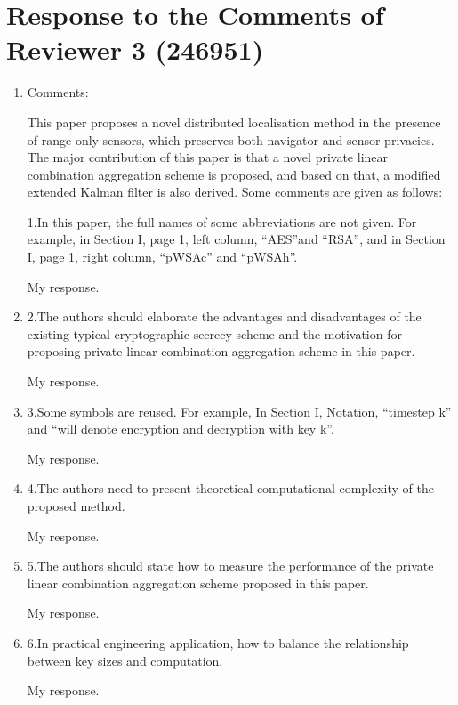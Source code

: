 \documentclass[a4paper]{scrartcl}
\newenvironment{rebuttal}{\begin{enumerate}[label={\color{grey}\thesection.\arabic{enumi}},leftmargin=0pt,ref=\thesection.\arabic{enumi}]}{\end{enumerate}}
\newcommand{\reviewtext}[1]{{\color{nblue} #1}}
\begin{document}
\section*{Response to the Comments of Reviewer 3 (246951)}
\def\thesection{R3}
\begin{rebuttal}
\item \reviewtext{Comments:

This paper proposes a novel distributed localisation method in the presence of range-only sensors, which preserves both navigator and sensor privacies. The major contribution of this paper is that a novel private linear combination aggregation scheme is proposed, and based on that, a modified extended Kalman filter is also derived. Some comments are given as follows:

1.In this paper, the full names of some abbreviations are not given. For example, in Section I, page 1, left column, “AES”and “RSA”, and in Section I, page 1, right column, “pWSAc” and “pWSAh”.}

My response.

\item \reviewtext{2.The authors should elaborate the advantages and disadvantages of the existing typical cryptographic secrecy scheme and the motivation for proposing private linear combination aggregation scheme in this paper.}

My response.

\item \reviewtext{3.Some symbols are reused. For example, In Section I, Notation, “timestep k” and “will denote encryption and decryption with key k”.}

My response.

\item \reviewtext{4.The authors need to present theoretical computational complexity of the proposed method.}

My response.

\item \reviewtext{5.The authors should state how to measure the performance of the private linear combination aggregation scheme proposed in this paper.}

My response.

\item \reviewtext{6.In practical engineering application, how to balance the relationship between key sizes and computation.}

My response.

\end{rebuttal}


\end{document}
